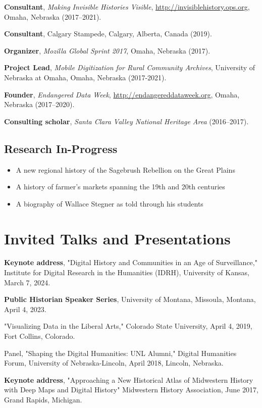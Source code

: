 \documentclass[10pt]{article}
\begin{document}
\textbf{Consultant}, \textit{Making Invisible Histories Visible}, \url{http://invisiblehistory.ops.org}, Omaha, Nebraska (2017--2021).

\textbf{Consultant}, Calgary Stampede, Calgary, Alberta, Canada (2019).

\textbf{Organizer}, \textit{Mozilla Global Sprint 2017}, Omaha, Nebraska (2017).

\textbf{Project Lead}, \textit{Mobile Digitization for Rural Community Archives}, University of Nebraska at Omaha, Omaha, Nebraska (2017-2021).

\textbf{Founder}, \textit{Endangered Data Week}, \url{http://endangereddataweek.org}, Omaha, Nebraska (2017--2020).

\textbf{Consulting scholar}, \textit{Santa Clara Valley National Heritage Area} (2016--2017).

\subsection*{Research In-Progress}\label{in-progress}

\begin{itemize}
\item A new regional history of the Sagebrush Rebellion on the Great Plains
\item A history of farmer's markets spanning the 19th and 20th centuries
\item A biography of Wallace Stegner as told through his students
\end{itemize}

\section{Invited Talks and Presentations}

\textbf{Keynote address}, "Digital History and Communities in an Age of Surveillance," Institute for Digital Research in the Humanities (IDRH), University of Kansas, March 7, 2024.

\textbf{Public Historian Speaker Series}, University of Montana, Missoula, Montana, April 4, 2023.

"Visualizing Data in the Liberal Arts," Colorado State University, April 4, 2019, Fort Collins, Colorado.

Panel, "Shaping the Digital Humanities: UNL Alumni," Digital Humanities Forum, University of Nebraska-Lincoln, April 2018, Lincoln, Nebraska.

\textbf{Keynote address}, "Approaching a New Historical Atlas of Midwestern History with Deep Maps and Digital History" Midwestern History Association, June 2017, Grand Rapids, Michigan.
\end{document}
